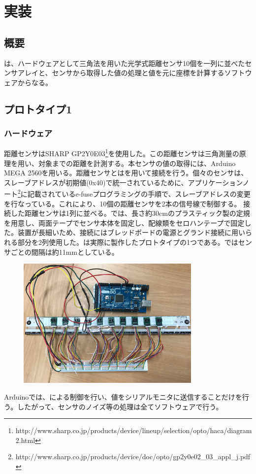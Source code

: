 \chapter{実装}
\section{概要}
\SysName は、ハードウェアとして三角法を用いた光学式距離センサ10個を一列に並べたセンサアレイと、センサから取得した値の処理と値を元に座標を計算するソフトウェアからなる。
\section{プロトタイプ1} 
\subsection{ハードウェア}
距離センサはSHARP GP2Y0E03\footnote{http://www.sharp.co.jp/products/device/lineup/selection/opto/haca/diagram2.html}を使用した。この距離センサは三角測量の原理を用い、対象までの距離を計測する。本センサの値の取得には、Arduino MEGA 2560を用いる。距離センサとは\iic を用いて接続を行う。個々のセンサは、スレーブアドレスが初期値(0x40)で統一されているために、アプリケーションノート\footnote{http://www.sharp.co.jp/products/device/doc/opto/gp2y0e02\_03\_appl\_j.pdf}に記載されているe-fuseプログラミングの手順で、スレーブアドレスの変更を行なっている。これにより、10個の距離センサを2本の信号線で制御する。
接続した距離センサは1列に並べる。\SysName では、長さ約30\si{cm}のプラスティック製の定規を用意し、両面テープでセンサ本体を固定し、配線類をセロハンテープで固定した。装置が長細いため、接続にはブレッドボードの電源とグランド接続に用いられる部分を2列使用した。は実際に製作したプロトタイプの1つである。ではセンサごとの間隔は約11\si{mm}としている。
\begin{figure}[htbp]
	\begin{center}
		\includegraphics[width = 90mm]{./img/IMG_1794.jpg}
	\end{center}
	\caption{}
	\label{img:ig1}
\end{figure}
Arduinoでは、\iic による制御を行い、値をシリアルモニタに送信することだけを行う。したがって、センサのノイズ等の処理は全てソフトウェアで行う。
